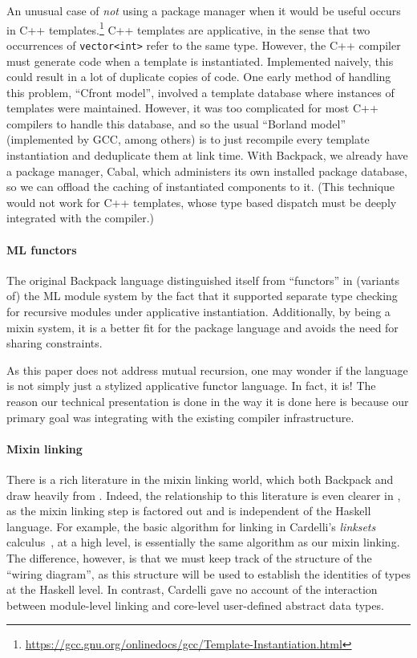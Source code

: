 An unusual case of \emph{not} using a package manager when it would be
useful occurs in C++ templates.\footnote{\smaller
  \url{https://gcc.gnu.org/onlinedocs/gcc/Template-Instantiation.html}}
C++ templates are
applicative, in the sense that two occurrences of \verb|vector<int>| refer to the
same type.  However, the C++ compiler must generate code when a
template is instantiated. Implemented naively, this could result in a
lot of duplicate copies of code.  One early method of handling this
problem, ``Cfront model'', involved a template database where
instances of templates were maintained.  However, it was too
complicated for most C++ compilers to handle this database, and so the
usual ``Borland model'' (implemented by GCC, among others) is to just
recompile every template instantiation and deduplicate them at link
time.  With Backpack, we already have a package manager, Cabal, which
administers its own installed package database, so we can offload the
caching of instantiated components to it.  (This technique would not
work for C++ templates, whose type based dispatch must be deeply
integrated with the compiler.)

\paragraph{ML functors}  The original Backpack language distinguished
itself from ``functors'' in (variants of) the ML module system
\cite{milner+:def-of-sml-revised,ocaml} by the fact that it supported
separate type checking for recursive modules under applicative
instantiation.  Additionally, by being a mixin system, it is a
better fit for the package language and avoids the need for
sharing constraints.

As this paper does not address mutual recursion, one may wonder
if the \unit{} language is not simply just a stylized applicative
functor language. In fact, it is!  The reason our technical presentation
is done in the way it is done here is because our primary goal
was integrating with the existing compiler infrastructure.

\paragraph{Mixin linking} There is a rich literature in the mixin
linking world, which both Backpack and \Backpack{} draw heavily from
\cite{ancona+:cms,flatt+:units,rossberg+:mixml}.  Indeed,
the relationship to this literature is even clearer in \Backpack{}, as
the mixin linking step is factored out and is independent of the
Haskell language.  For example, the basic algorithm for linking in
Cardelli's \emph{linksets} calculus~\cite{cardelli:linksets}, at a
high level, is essentially the same algorithm as our mixin linking.
The difference, however, is that we must keep track of the structure
of the ``wiring diagram'', as this structure will be used to establish
the identities of types at the Haskell level.  In contrast, Cardelli
gave no account of the interaction between module-level linking and
core-level user-defined abstract data types.

